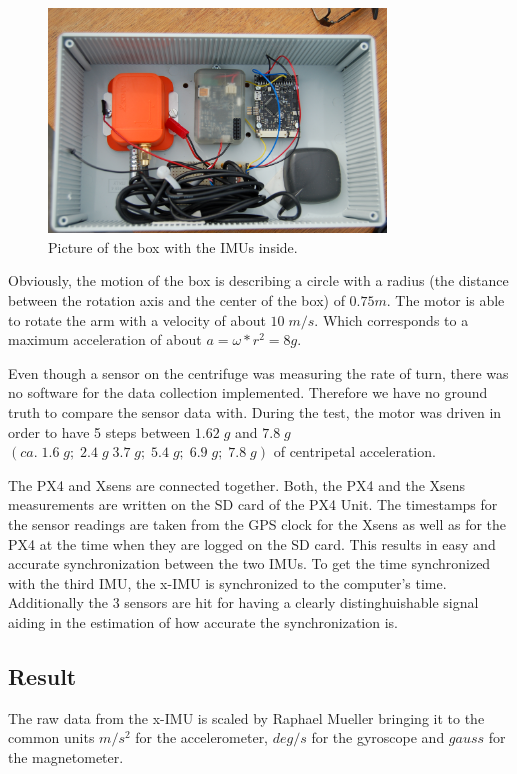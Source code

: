 \begin{figure}[hb]
\begin{center}
\includegraphics[width=0.8\textwidth]{pictures/box.JPG}
\caption{Picture of the box with the IMUs inside.}
\label{box}
\end{center}
\end{figure}
Obviously, the motion of the box is describing a circle with a radius (the distance between the rotation axis and the  center of the box) of $0.75 m$. The motor is able to rotate the arm with a velocity of about $10\; m/s$. Which corresponds to a maximum acceleration of about $ a=\omega*r^2=8 g$. 

Even though a sensor on the centrifuge was measuring the rate of turn, there was no software for the data collection implemented. Therefore we have no ground truth to compare the sensor data with. 
During the test, the motor was driven in order to have 5 steps between $1.62\;g$ and $7.8\;g$ $(ca.\;1.6\;g;\;2.4\;g\;3.7\;g;\;5.4\;g;\;6.9\;g;\;7.8\;g)$ of centripetal acceleration.

The PX4 and Xsens are connected together. Both, the PX4 and the Xsens measurements are written on the SD card of the PX4 Unit. The timestamps for the sensor readings are taken from the GPS clock for the Xsens as well as for the PX4 at the time when they are logged on the SD card. This results in easy and accurate synchronization between the two IMUs. To get the time synchronized with the third IMU, the x-IMU is synchronized to the computer's time. Additionally the 3 sensors are hit for having a clearly distinghuishable signal aiding in the estimation of how accurate the synchronization is.
\subsection{Result}
The raw data from the x-IMU is scaled by Raphael Mueller bringing it to the common units $m/s^2$ for the accelerometer, $deg/s$ for the gyroscope and $gauss$ for the magnetometer.

